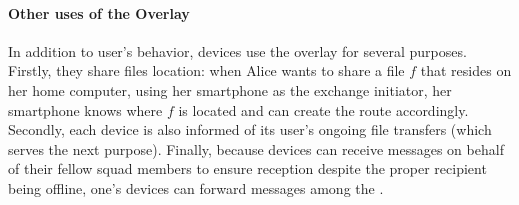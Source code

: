 


\paragraph*{Other uses of the \squad Overlay} In addition to user's behavior, devices use the \squad overlay for several purposes. Firstly, they share files location: when Alice wants to share a file $f$ that resides on her home computer, using her smartphone as the exchange initiator, her smartphone knows where $f$ is located and can create the route accordingly. 
Secondly, each device is also informed of its user's ongoing file transfers (which serves the next purpose).
Finally, because devices can receive messages on behalf of their fellow squad members to ensure reception despite the proper recipient being offline, 
one's devices can forward messages among the \squad.


